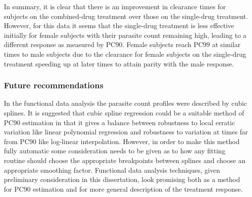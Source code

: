 In summary, it is clear that there is an improvement in clearance times for subjects on the combined-drug treatment over those on the single-drug treatment. However, for this data it seems that the single-drug treatment is less effective initially for female subjects with their parasite count remaining high, leading to a different response as measured by PC90. Female subjects reach PC99 at similar times to male subjects due to the clearance for female subjects on the single-drug treatment speeding up at later times to attain parity with the male response.

\subsubsection{Future recommendations}
In the functional data analysis the parasite count profiles were described by cubic splines. It is suggested that cubic spline regression could be a suitable method of PC90 estimation in that it gives a balance between robustness to local erratic variation like linear polynomial regression and robustness to variation at times far from PC90 like log-linear interpolation.  However, in order to make this method fully automatic some consideration needs to be given as to how any fitting routine should choose the appropriate breakpoints between splines and choose an appropriate smoothing factor. Functional data analysis techniques, given preliminary consideration in this dissertation, look promising both as a method for PC90 estimation and for more general description of the treatment response.